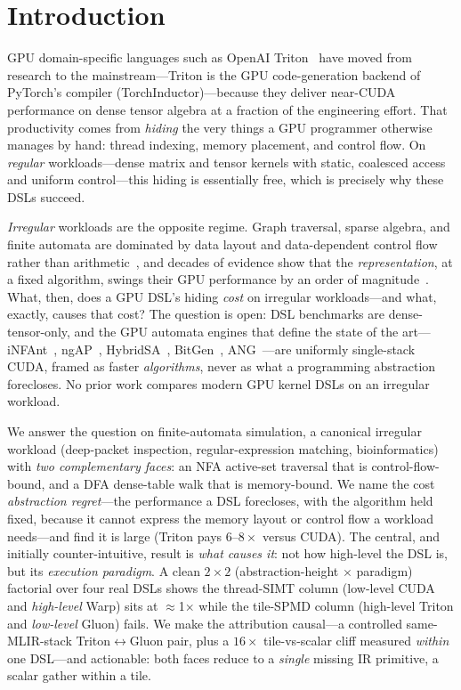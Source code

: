\documentclass[conference]{IEEEtran}
\begin{document}
\section{Introduction}
GPU domain-specific languages such as OpenAI Triton~\cite{triton} have moved from research to
the mainstream---Triton is the GPU code-generation backend of PyTorch's compiler
(TorchInductor)---because they
deliver near-CUDA performance on dense tensor algebra at a fraction of the engineering effort.
That productivity comes from \emph{hiding} the very things a GPU programmer otherwise manages by
hand: thread indexing, memory placement, and control flow. On \emph{regular} workloads---dense
matrix and tensor kernels with static, coalesced access and uniform control---this hiding is
essentially free, which is precisely why these DSLs succeed.

\emph{Irregular} workloads are the opposite regime. Graph traversal, sparse algebra, and finite
automata are dominated by data layout and data-dependent control flow rather than
arithmetic~\cite{burtscher}, and decades of evidence show that the \emph{representation}, at a
fixed algorithm, swings their GPU performance by an order of magnitude~\cite{bestsf,sparsetir}.
What, then, does a GPU DSL's hiding \emph{cost} on irregular workloads---and what, exactly,
causes that cost? The question is open: DSL benchmarks are dense-tensor-only, and the GPU
automata engines that define the state of the art---iNFAnt~\cite{infant}, ngAP~\cite{ngap},
HybridSA~\cite{hybridsa}, BitGen~\cite{bitgen}, ANG~\cite{ang}---are uniformly single-stack CUDA,
framed as faster \emph{algorithms}, never as what a programming abstraction forecloses. No prior
work compares modern GPU kernel DSLs on an irregular workload.

We answer the question on finite-automata simulation, a canonical irregular workload
(deep-packet inspection, regular-expression matching, bioinformatics) with \emph{two
complementary faces}: an NFA active-set traversal that is control-flow-bound, and a DFA
dense-table walk that is memory-bound. We name the cost \emph{abstraction regret}---the
performance a DSL forecloses, with the algorithm held fixed, because it cannot express the
memory layout or control flow a workload needs---and find it is large (Triton pays $6$--$8\times$
versus CUDA). The central, and initially counter-intuitive, result is \emph{what causes it}:
not how high-level the DSL is, but its \emph{execution paradigm}. A clean $2\times2$
(abstraction-height $\times$ paradigm) factorial over four real DSLs shows the thread-SIMT
column (low-level CUDA and \emph{high-level} Warp) sits at $\approx$1$\times$ while the tile-SPMD
column (high-level Triton and \emph{low-level} Gluon) fails. We make the attribution causal---a
controlled same-MLIR-stack Triton$\leftrightarrow$Gluon pair, plus a $16\times$ tile-vs-scalar
cliff measured \emph{within} one DSL---and actionable: both faces reduce to a \emph{single}
missing IR primitive, a scalar gather within a tile.
\end{document}
